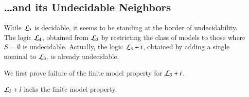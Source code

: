 
\subsection{\ldots and its Undecidable Neighbors}

While $\mathcal{L}_3$ is decidable, it seems to be standing at the border
of undecidability.  The logic $\mathcal{L}_4$, obtained from $\mathcal{L}_3$ by
restricting the class of models to those where $S=\emptyset$ is
undecidable.  Actually, the logic $\mathcal{L}_3+i$, obtained by adding
a single nominal to $\mathcal{L}_3$, is already undecidable.

We first prove failure of the finite model property for $\mathcal{L}_3 + i$.

\begin{thm}\label{thm:tlmi:inf}
$\mathcal{L}_3 + i$ lacks the finite model property.
\end{thm}

